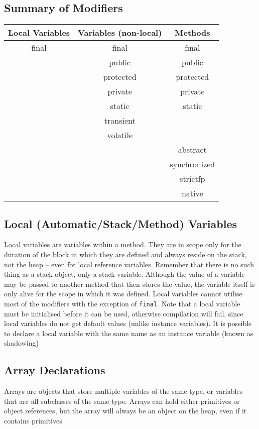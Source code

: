 \subsection{Summary of Modifiers}
\begin{center}
\begin{tabular}{ccc}
    \textbf{Local Variables} & \textbf{Variables (non-local)} & 
    \textbf{Methods} \\
    \hline
    final & final & final \\
    & public & public \\
    & protected & protected \\
    & private & private \\
    & static & static \\
    & transient & \\
    & volatile & \\
    & & abstract \\
    & & synchronized \\
    & & strictfp \\
    & & native \\
\end{tabular}
\end{center}

\subsection{Local (Automatic/Stack/Method) Variables}
Local variables are variables within a method. They are in scope only for the 
duration of the block in which they are defined and always reside on the stack, 
not the heap -- even for local reference variables. Remember that there is no 
such thing as a stack object, only a stack variable. Although the value of a 
variable may be passed to another method that then stores the value, the 
variable itself is only alive for the scope in which it was defined. Local 
variables cannot utilise most of the modifiers with the exception of 
\verb#final#. Note that a local variable must be initialised before it can be 
used, otherwise compilation will fail, since local variables do not get default 
values (unlike instance variables). It is possible to declare a local variable 
with the same name as an instance variable (known as shadowing)

\subsection{Array Declarations}
Arrays are objects that store multiple variables of the same type, or variables 
that are all subclasses of the same type. Arrays can hold either primitives or 
object references, but the array will always be an object on the heap, even if 
it contains primitives

